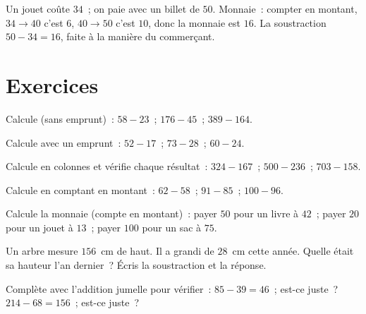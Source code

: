 \begin{example}\label{ex:g2:subtraction:change}
Un jouet coûte $34$~; on paie avec un billet de $50$. Monnaie~:
compter en montant, $34 \to 40$ c'est $6$, $40 \to 50$ c'est $10$,
donc la monnaie est $16$. La soustraction $50 - 34 = 16$, faite à
la manière du commerçant.
\end{example}

\section{Exercices}

\begin{exercise}[$\star$]\label{exo:g2:subtraction:1}
Calcule (sans emprunt)~: $58 - 23$~; \quad $176 - 45$~; \quad
$389 - 164$.
\end{exercise}

\begin{exercise}[$\star$]\label{exo:g2:subtraction:2}
Calcule avec un emprunt~: $52 - 17$~; \quad $73 - 28$~; \quad
$60 - 24$.
\end{exercise}

\begin{exercise}[$\star$]\label{exo:g2:subtraction:3}
Calcule en colonnes et vérifie chaque résultat~: $324 - 167$~;
\quad $500 - 236$~; \quad $703 - 158$.
\end{exercise}

\begin{exercise}[$\star$]\label{exo:g2:subtraction:4}
Calcule en comptant en montant~: $62 - 58$~; \quad $91 - 85$~; \quad
$100 - 96$.
\end{exercise}

\begin{exercise}[$\star$]\label{exo:g2:subtraction:5}
Calcule la monnaie (compte en montant)~: payer $50$ pour un livre à
$42$~; payer $20$ pour un jouet à $13$~; payer $100$ pour un sac à
$75$.
\end{exercise}

\begin{exercise}[$\star$]\label{exo:g2:subtraction:6}
\guillemotleft{} Un arbre mesure $156$~cm de haut. Il a grandi de
$28$~cm cette année. Quelle était sa hauteur l'an dernier~?
\guillemotright{} Écris la soustraction et la réponse.
\end{exercise}

\begin{exercise}[$\star$]\label{exo:g2:subtraction:7}
Complète avec l'addition jumelle pour vérifier~:
$85 - 39 = 46$~; est-ce juste~? $214 - 68 = 156$~; est-ce juste~?
\end{exercise}


